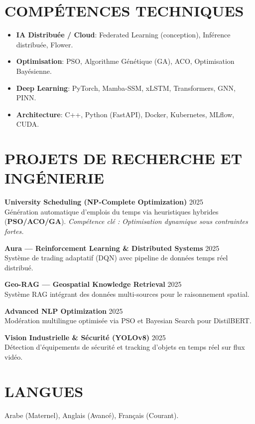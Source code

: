\documentclass[a4paper,11pt]{article}
\begin{document}
\section{COMPÉTENCES TECHNIQUES}
\begin{itemize}
    \item \textbf{IA Distribuée / Cloud}: Federated Learning (conception), Inférence distribuée, Flower.
    \item \textbf{Optimisation}: PSO, Algorithme Génétique (GA), ACO, Optimisation Bayésienne.
    \item \textbf{Deep Learning}: PyTorch, Mamba-SSM, xLSTM, Transformers, GNN, PINN.
    \item \textbf{Architecture}: C++, Python (FastAPI), Docker, Kubernetes, MLflow, CUDA.
\end{itemize}

\section{PROJETS DE RECHERCHE ET INGÉNIERIE}

\textbf{University Scheduling (NP-Complete Optimization)} \hfill 2025 \\
Génération automatique d'emplois du temps via heuristiques hybrides (\textbf{PSO/ACO/GA}).
\textit{Compétence clé : Optimisation dynamique sous contraintes fortes.}

\textbf{Aura — Reinforcement Learning & Distributed Systems} \hfill 2025 \\
Système de trading adaptatif (DQN) avec pipeline de données temps réel distribué.

\textbf{Geo-RAG — Geospatial Knowledge Retrieval} \hfill 2025 \\
Système RAG intégrant des données multi-sources pour le raisonnement spatial.

\textbf{Advanced NLP Optimization} \hfill 2025 \\
Modération multilingue optimisée via PSO et Bayesian Search pour DistilBERT.

\textbf{Vision Industrielle \& Sécurité (YOLOv8)} \hfill 2025 \\
Détection d'équipements de sécurité et tracking d'objets en temps réel sur flux vidéo.

\section{LANGUES}
Arabe (Maternel), Anglais (Avancé), Français (Courant).
\end{document}
